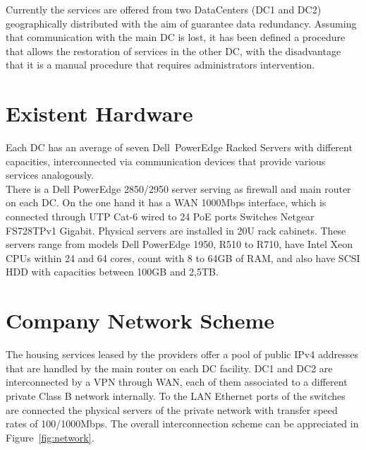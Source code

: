 \documentclass[a4paper, 12pt]{book}
\begin{document}
Currently the services are offered from two DataCenters (DC1 and DC2) geographically distributed with the aim of guarantee data redundancy. Assuming that communication with the main DC is lost, it has been defined a procedure that allows the restoration of services in the other DC, with the disadvantage that it is a manual procedure that requires administrators intervention.

\section{Existent Hardware}
\label{sec:hardware}

Each DC has an average of seven Dell\texttrademark \ PowerEdge Racked Servers with different capacities, interconnected via communication devices that provide various services analogously.\\

There is a Dell PowerEdge 2850/2950 server serving as firewall and main router on each DC. On the one hand it has a WAN 1000Mbps interface, which is connected through UTP Cat-6 wired to 24 PoE ports Switches Netgear FS728TPv1 Gigabit. Physical servers are installed in 20U rack cabinets. These servers range from models Dell PowerEdge 1950, R510 to R710, have Intel Xeon CPUs within 24 and 64 cores, count with 8 to 64GB of RAM, and also have SCSI HDD with capacities between 100GB and 2,5TB.

\section{Company Network Scheme}
\label{sec:network}

The housing services leased by the providers offer a pool of public IPv4 addresses that are handled by the main router on each DC facility. DC1 and DC2 are interconnected by a VPN through WAN, each of them associated to a different private Class B network internally. To the LAN Ethernet ports of the switches are connected the physical servers of the private network with transfer speed rates of 100/1000Mbps. The overall interconnection scheme can be appreciated in Figure~\ref{fig:network}.
\end{document}
